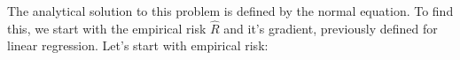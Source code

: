 \documentclass[reqno]{amsart}
\theoremstyle{definition}
\theoremstyle{remark}
\numberwithin{equation}{section}
\begin{document}



The analytical solution to this problem is defined by the normal equation. To find this, we start with the empirical risk $\hat{R}$ and it's gradient, previously defined for linear regression. Let's start with empirical risk: \\
\end{document}
